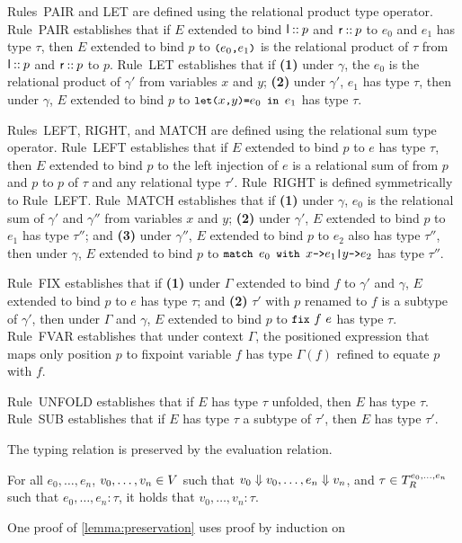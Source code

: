 Rules~PAIR and LET are defined using the relational product type
operator.
Rule~PAIR establishes that if $E$ extended to bind
$\mathsf{l} \mathbin{::} p$ and $\mathsf{r} \mathbin{::} p$ to $e_0$ and $e_1$ has
type $\tau$, then $E$ extended to bind $p$ to $\pair{ e_0 }{ e_1 }$ is
the relational product of $\tau$ from $\mathsf{l} \mathbin{::} p$ and
$\mathsf{r} \mathbin{::} p$ to $p$.
Rule~LET establishes that if %
\textbf{(1)} under $\gamma$, the $e_0$ is the relational product of
$\gamma'$ from variables $x$ and $y$;
%
\textbf{(2)} under $\gamma'$, $e_1$ has type $\tau$, then under
$\gamma$, $E$ extended to bind $p$ to $\letexp{x}{y}{e_0}{e_1}$ has
type $\tau$.

Rules~LEFT, RIGHT, and MATCH are defined using the relational sum type
operator.
Rule~LEFT establishes that if $E$ extended to bind $p$ to $e$ has type
$\tau$, then $E$ extended to bind $p$ to the left injection of $e$ is
a relational sum of from $p$ and $p$ to $p$ of $\tau$ and any
relational type $\tau'$.
%
Rule~RIGHT is defined symmetrically to Rule~LEFT.
Rule~MATCH establishes that if %
\textbf{(1)} under $\gamma$, $e_0$ is the relational sum of $\gamma'$
and $\gamma''$ from variables $x$ and $y$;
% 
\textbf{(2)} under $\gamma'$, $E$ extended to bind $p$ to $e_1$ has
type $\tau''$; and
%
\textbf{(3)} under $\gamma''$, $E$ extended to bind $p$ to $e_2$ also
has type $\tau''$, then under $\gamma$, $E$ extended to bind $p$ to
$\matchexp{e_0}{x}{e_1}{y}{e_2}$ has type $\tau''$.

Rule~FIX establishes that if %
\textbf{(1)} under $\Gamma$ extended to bind $f$ to $\gamma'$ and
$\gamma$, $E$ extended to bind $p$ to $e$ has type $\tau$; and %
\textbf{(2)} $\tau'$ with $p$ renamed to $f$ is a subtype of
$\gamma'$, then under $\Gamma$ and $\gamma$, $E$ extended to bind $p$
to $\fix{f}{e}$ has type $\tau$.
Rule~FVAR establishes that under context $\Gamma$, the positioned
expression that maps only position $p$ to fixpoint variable $f$ has
type $\Gamma(f)$ refined to equate $p$ with $f$.

Rule~UNFOLD establishes that if $E$ has type $\tau$ unfolded,
then $E$ has type $\tau$.
Rule~SUB establishes that if $E$ has type $\tau$ a subtype of $\tau'$,
then $E$ has type $\tau'$.

The typing relation is preserved by the evaluation relation.
%
\begin{lemma}
  \label{lemma:preservation}
  For all $e_0, \ldots, e_n$, $v_0, \ldots, v_n \in V$ such that
  $v_0 \Downarrow v_0, \ldots, e_n \Downarrow v_n$, and
  $\tau \in T_{R}^{e_0, \ldots, e_n}$ such that
  $e_0, \ldots, e_n : \tau$, it holds that $v_0, \ldots, v_n : \tau$.
\end{lemma}
%
One proof of \autoref{lemma:preservation} uses proof by induction on
%

